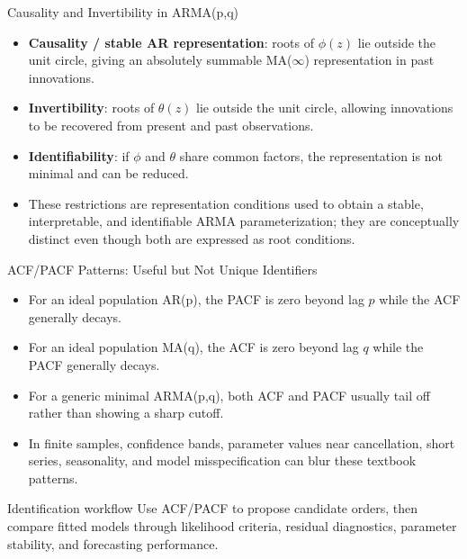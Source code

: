 \documentclass{beamer}
\begin{document}
\begin{frame}{Causality and Invertibility in ARMA(p,q)}
  \begin{itemize}
    \item \textbf{Causality / stable AR representation}: roots of $\phi(z)$ lie outside the unit circle, giving an absolutely summable MA($\infty$) representation in past innovations.
    \item \textbf{Invertibility}: roots of $\theta(z)$ lie outside the unit circle, allowing innovations to be recovered from present and past observations.
    \item \textbf{Identifiability}: if $\phi$ and $\theta$ share common factors, the representation is not minimal and can be reduced.
    \item These restrictions are representation conditions used to obtain a stable, interpretable, and identifiable ARMA parameterization; they are conceptually distinct even though both are expressed as root conditions.
  \end{itemize}
\end{frame}
\begin{frame}{ACF/PACF Patterns: Useful but Not Unique Identifiers}
  \begin{itemize}
    \item For an ideal population AR(p), the PACF is zero beyond lag $p$ while the ACF generally decays.
    \item For an ideal population MA(q), the ACF is zero beyond lag $q$ while the PACF generally decays.
    \item For a generic minimal ARMA(p,q), both ACF and PACF usually tail off rather than showing a sharp cutoff.
    \item In finite samples, confidence bands, parameter values near cancellation, short series, seasonality, and model misspecification can blur these textbook patterns.
  \end{itemize}
  \begin{alertblock}{Identification workflow}
    Use ACF/PACF to propose candidate orders, then compare fitted models through likelihood criteria, residual diagnostics, parameter stability, and forecasting performance.
  \end{alertblock}
\end{frame}
\end{document}

